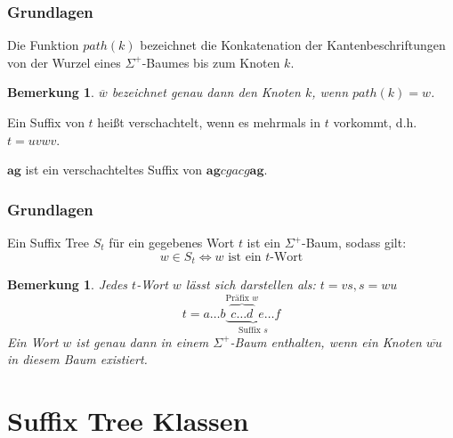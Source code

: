 \documentclass{beamer}
\newtheorem{remark}[theorem]{Bemerkung}
\begin{document}
\begin{frame}
\frametitle{Grundlagen}
\begin{definition}[Pfad]
    Die Funktion $path(k)$ bezeichnet die Konkatenation der Kantenbeschriftungen von der Wurzel eines $\Sigma^+$-Baumes bis zum Knoten $k$.
    \begin{remark}
    $\overline{w}$ bezeichnet genau dann den Knoten $k$, wenn $path(k) = w$.
    \end{remark}
\end{definition}
\begin{definition}
    Ein Suffix von $t$ heißt verschachtelt, wenn es mehrmals in $t$ vorkommt, d.h. $t = uvwv$.
\end{definition}
\begin{example}
    $\boldsymbol{ag}$ ist ein verschachteltes Suffix von $\boldsymbol{ag}cgacg\boldsymbol{ag}$.
\end{example}
\end{frame}

\begin{frame}
\frametitle{Grundlagen}
\begin{definition}
    Ein Suffix Tree $S_t$ für ein gegebenes Wort $t$ ist ein $\Sigma^+$-Baum, sodass gilt:
    $$w \in S_t  \Longleftrightarrow w \text{ ist ein }t\text{-Wort}$$
\end{definition}
\begin{remark}
    Jedes $t$-Wort $w$ lässt sich darstellen als: $t = vs, s = wu$
    $$t = a \dots b \underbrace{\overbrace{c \dots d}^{\text{Präfix }w} e \dots f}_{\text{Suffix }s}$$
    Ein Wort $w$ ist genau dann in einem $\Sigma^+$-Baum enthalten, wenn ein Knoten $\overline{wu}$ in diesem Baum existiert.
\end{remark}
\end{frame}

\section{Suffix Tree Klassen}
\end{document}
